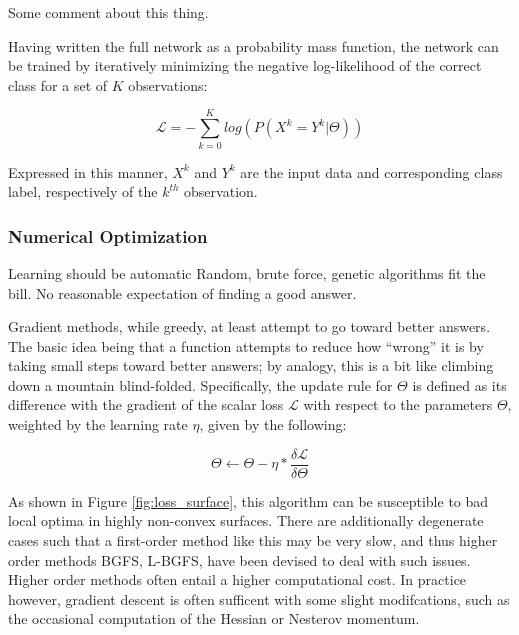 \noindent Some comment about this thing.

Having written the full network as a probability mass function, the network can be trained by iteratively minimizing the negative log-likelihood of the correct class for a set of $K$ observations:

\begin{equation}
\label{eq:nll}
\mathcal{L}=-\sum_{k=0}^K log(P(X^k = Y^k \vert \Theta))
\end{equation}

\noindent Expressed in this manner, $X^k$ and $Y^k$ are the input data and corresponding class label, respectively of the $k^{th}$ observation.


\subsubsection{Numerical Optimization}

Learning should be automatic
Random, brute force, genetic algorithms fit the bill.
No reasonable expectation of finding a good answer.

Gradient methods, while greedy, at least attempt to go toward better answers.
The basic idea being that a function attempts to reduce how ``wrong'' it is by taking small steps toward better answers; by analogy, this is a bit like climbing down a mountain blind-folded.
Specifically, the update rule for $\Theta$ is defined as its difference with the gradient of the scalar loss $\mathcal{L}$ with respect to the parameters $\Theta$, weighted by the learning rate $\eta$, given by the following:

\begin{equation}
\label{eq:updaterule}
\Theta \leftarrow \Theta - \eta * \frac{ \delta \mathcal{L}}{\delta \Theta}
\end{equation}

As shown in Figure \ref{fig:loss_surface}, this algorithm can be susceptible to bad local optima in highly non-convex surfaces.
There are additionally degenerate cases such that a first-order method like this may be very slow, and thus higher order methods BGFS, L-BGFS, have been devised to deal with such issues.
Higher order methods often entail a higher computational cost.
In practice however, gradient descent is often sufficent with some slight modifcations, such as the occasional computation of the Hessian \cite{} or Nesterov momentum.



